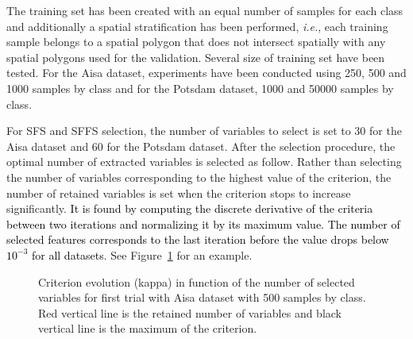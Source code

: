 \documentclass[journal,10pt]{IEEEtran}
\newcommand{\rev}[1]{\textcolor{black}{#1}}
\begin{document}
    The training set has been created  with an equal number of samples
    for each class and additionally  a spatial stratification has been
    performed, \emph{i.e.}, each training  sample belongs to a spatial
    polygon  that  does  not  intersect  spatially  with  any  spatial
    polygons used  for the validation.   Several size of  training set
    have been  tested.  For  the Aisa  dataset, experiments  have been
    conducted using  250, 500 and  1000 samples  by class and  for the
    Potsdam dataset, 1000 and 50000 samples by class.

    For SFS and  SFFS selection, the number of variables  to select is
    set to  30 for the  Aisa dataset and  60 for the  Potsdam dataset.
    After  the selection  procedure, the  optimal number  of extracted
    variables is selected as follow.  Rather than selecting the number
    of variables corresponding to the  highest value of the criterion,
    the number of  retained variables is set when  the criterion stops
    to  increase significantly.   \rev{It  is found  by computing  the
      discrete derivative  of the criteria between  two iterations and
      normalizing it  by its  maximum value.   The number  of selected
      features  corresponds to  the  last iteration  before the  value
      drops    below    $10^{-3}$     for    all    datasets}.     See
    Figure~\ref{fig:crit-evol} for an example.

    \begin{figure}[!t]
        \centering
        \caption{Criterion evolution (kappa) in function of the number of selected variables for first trial with Aisa dataset with 500 samples by class. Red vertical line is the retained number of variables and black vertical line is the maximum of the criterion.\label{fig:crit-evol}}
    \end{figure}
\end{document}
